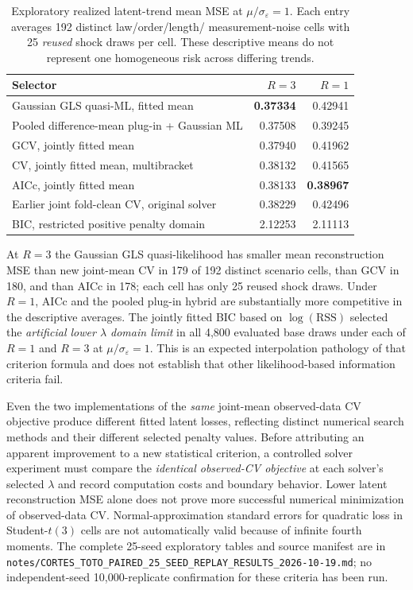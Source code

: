 \documentclass[11pt]{article}
\begin{document}
\begin{table}[ht]
\centering
\caption{Exploratory realized latent-trend mean
MSE at $\mu/\sigma_\varepsilon=1$.
Each entry averages 192 distinct law/order/length/
measurement-noise cells with 25 \emph{reused}
shock draws per cell. These descriptive means
do not represent one homogeneous
risk across differing trends.}
\label{tab:cortes-criteria-matched-pilot}
\begin{tabular}{lrr}
\toprule
Selector & $R=3$ & $R=1$\\
\midrule
Gaussian GLS quasi-ML, fitted mean & \textbf{0.37334} & 0.42941\\
Pooled difference-mean plug-in + Gaussian ML & 0.37508 & 0.39245\\
GCV, jointly fitted mean & 0.37940 & 0.41962\\
CV, jointly fitted mean, multibracket & 0.38132 & 0.41565\\
AICc, jointly fitted mean & 0.38133 & \textbf{0.38967}\\
Earlier joint fold-clean CV, original solver & 0.38229 & 0.42496\\
BIC, restricted positive penalty domain & 2.12253 & 2.11113\\
\bottomrule
\end{tabular}
\end{table}

At $R=3$ the Gaussian GLS quasi-likelihood
has smaller mean reconstruction MSE than
new joint-mean CV in 179 of 192 distinct
scenario cells, than GCV in 180, and
than AICc in 178; each cell has only
25 reused shock draws. Under $R=1$,
AICc and the pooled plug-in hybrid are
substantially more competitive in the
descriptive averages. The jointly fitted
BIC based on $\log(\mathrm{RSS})$ selected
the \emph{artificial lower $\lambda$ domain
limit} in all 4,800 evaluated base draws
under each of $R=1$ and $R=3$ at
$\mu/\sigma_\varepsilon=1$.
This is an expected interpolation
pathology of that criterion formula
and does not establish that other
likelihood-based information criteria fail.

Even the two implementations of the
\emph{same} joint-mean observed-data
CV objective produce different fitted
latent losses, reflecting distinct
numerical search methods and their
different selected penalty values.
Before attributing an apparent improvement
to a new statistical criterion, a
controlled solver experiment must compare
the \emph{identical observed-CV objective}
at each solver's selected $\lambda$ and
record computation costs and boundary
behavior. Lower latent reconstruction MSE
alone does not prove more successful
numerical minimization of observed-data CV.
Normal-approximation standard errors
for quadratic loss in Student-$t(3)$
cells are not automatically valid because
of infinite fourth moments. The complete
25-seed exploratory tables and source
manifest are in
\texttt{notes/CORTES\_TOTO\_PAIRED\_25\_SEED\_REPLAY\_RESULTS\_2026-10-19.md};
no independent-seed 10,000-replicate
confirmation for these criteria has been run.
\end{document}
